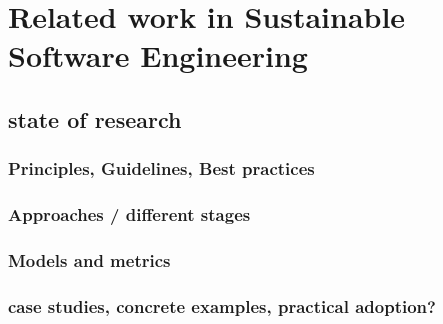 


\chapter{Related work in Sustainable Software Engineering}
\section{state of research}



\subsection{Principles, Guidelines, Best practices}


\subsection{Approaches / different stages} %

\subsection{Models and metrics} %


\subsection{case studies, concrete examples, practical adoption?}


